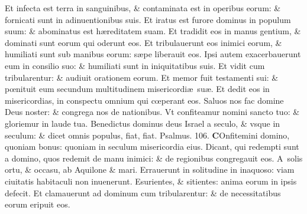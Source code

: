 \documentclass[a5paper,10pt]{book}
\def\ae{æ}
\def\oe{œ}
\begin{document}
\begin{multicols*}{2}
\newline \color{red} E\color{black}t infecta est terra in sanguinibus, \& contaminata est in operibus eorum: \& fornicati sunt in adinuentionibus suis.
\newline \color{red} E\color{black}t iratus est furore dominus in populum suum: \& abominatus est h\ae reditatem suam.
\newline \color{red} E\color{black}t tradidit eos in manus gentium, \& dominati sunt eorum qui oderunt eos.
\newline \color{red} E\color{black}t tribulauerunt eos inimici eorum, \& humiliati sunt sub manibus eorum: s\ae pe liberauit eos.
\newline \color{red} I\color{black}psi autem exacerbauerunt eum in consilio suo: \& humiliati sunt in iniquitatibus suis.
\newline \color{red} E\color{black}t vidit cum tribularentur: \& audiuit orationem eorum.
\newline \color{red} E\color{black}t memor fuit testamenti sui: \& p\oe nituit eum secundum multitudinem misericordi\ae \ su\ae .
\newline \color{red} E\color{black}t dedit eos in misericordias, in conspectu omnium qui c\oe perant eos.
\newline \color{red} S\color{black}aluos nos fac domine Deus noster: \& congrega nos de nationibus.
\newline \color{red} V\color{black}t confiteamur nomini sancto tuo: \& gloriemur in laude tua.
\newline \color{red} B\color{black}enedictus dominus deus Israel a seculo, \& vsque in seculum: \& dicet omnis populus, fiat, fiat. \color{red} Psalmus. 106. \color{black}
\vspace{-1.5em}
\lettrine[lines=2]{\bfseries \color{red} C}{}Onfitemini domino, quoniam bonus: quoniam in seculum misericordia eius.
\newline \color{red} D\color{black}icant, qui redempti sunt a domino, quos redemit de manu inimici: \& de regionibus congregauit eos.
\newline \color{red} A\color{black}\ solis ortu, \& occasu, ab Aquilone \& mari.
\newline \color{red} E\color{black}rrauerunt in solitudine in inaquoso: viam ciuitatis habitaculi non inuenerunt.
\newline \color{red} E\color{black}surientes, \& sitientes: anima eorum in ipsis defecit.
\newline \color{red} E\color{black}t clamauerunt ad dominum cum tribularentur: \& de necessitatibus eorum eripuit eos.

\end{multicols*}
\end{document}
